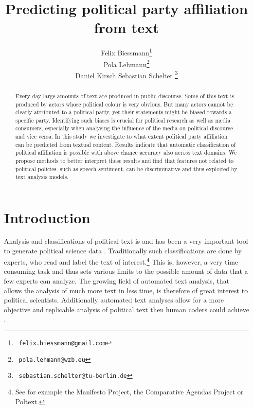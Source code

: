 \documentclass[11pt]{article}
\title{Predicting political party affiliation from text}
\author{Felix Biessmann\thanks{~\tt felix.biessmann@gmail.com}\\
    \And
 Pola Lehmann\thanks{ ~{\tt pola.lehmann@wzb.eu} }\\
\And 
Daniel Kirsch
 \And
  Sebastian Schelter \thanks{~\tt sebastian.schelter@tu-berlin.de}\\ 
}
\date{}
\begin{document}
\maketitle

\begin{abstract}
Every day large amounts of text are produced in public discourse. Some of this text is produced by actors whose political colour is very obvious. But many actors cannot be clearly attributed to a political party, yet their statements might be biased towards a specific party. Identifying such biases is crucial for political research as well as media consumers, especially when analysing the influence of the media on political discourse and vice versa. In this study we investigate to what extent political party affiliation can be predicted from textual content. Results indicate that automatic classification of political affiliation is possible with above chance accuracy also across text domains. We propose methods to better interpret these results and find that features not related to political policies, such as speech sentiment, can be discriminative and thus exploited by text analysis models. 
\end{abstract}

\section{Introduction}
\label{sec:intro}
%
Analysis and classifications of political text is and has been a very important tool to generate political science data \cite{Benoit.Forthcoming}. Traditionally such classifications are done by experts, who read and label the text of interest.\footnote{See for example the Manifesto Project, the Comparative Agendas Project or Poltext.} This is, however, a very time consuming task and thus sets various limits to the possible amount of data that a few experts can analyze. The growing field of automated text analysis, that allows the analysis of much more text in less time, is therefore of great interest to political scientists. Additionally automated text analyses allow for a more objective and replicable analysis of political text then human coders could achieve \cite{Benoit.2}.
\end{document}
